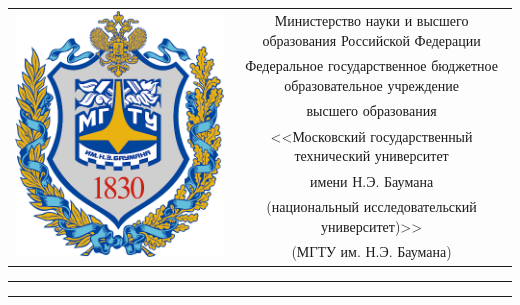 \begin{titlepage}
    \centering

     \begin{table}[H]
        \footnotesize
        \bfseries
        \begin{tabular}{cc}
            \multirow{7}{*}{\includegraphics[scale=0.15]{images/bmstu_logo.png}}
            & Министерство науки и высшего образования Российской Федерации \\
            & Федеральное государственное бюджетное образовательное учреждение \\
            & высшего образования \\
            & <<Московский государственный технический университет \\
            & имени Н.Э. Баумана \\
            & (национальный исследовательский университет)>> \\
            & (МГТУ им. Н.Э. Баумана) \\
        \end{tabular}
    \end{table}

    \vspace{-2.4cm}

    \begin{flushleft}
        \rule[-1cm]{\textwidth}{0.5pt}
        \rule{\textwidth}{2.5pt}
    \end{flushleft}


\end{titlepage}
